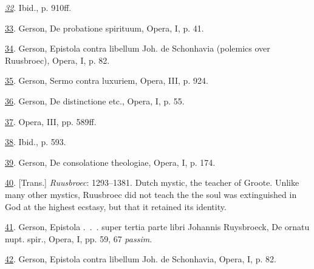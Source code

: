 \emph{\protect\hypertarget{23_NOTES.xhtmlux5cux23id_844}{\protect\hyperlink{15_Chapter_Eight__RELIGIOUS_EXCITAT.xhtmlux5cux23id_843}{32}}}.
Ibid., p. 910ff.

\protect\hypertarget{23_NOTES.xhtmlux5cux23id_842}{\protect\hyperlink{15_Chapter_Eight__RELIGIOUS_EXCITAT.xhtmlux5cux23id_841}{33}}.
Gerson, De probatione spirituum, Opera, I, p. 41.

\protect\hypertarget{23_NOTES.xhtmlux5cux23id_840}{\protect\hyperlink{15_Chapter_Eight__RELIGIOUS_EXCITAT.xhtmlux5cux23id_839}{34}}.
Gerson, Epistola contra libellum Joh. de Schonhavia (polemics over
Ruusbroec), Opera, I, p. 82.

\protect\hypertarget{23_NOTES.xhtmlux5cux23id_838}{\protect\hyperlink{15_Chapter_Eight__RELIGIOUS_EXCITAT.xhtmlux5cux23id_837}{35}}.
Gerson, Sermo contra luxuriem, Opera, III, p. 924.

\protect\hypertarget{23_NOTES.xhtmlux5cux23id_836}{\protect\hyperlink{15_Chapter_Eight__RELIGIOUS_EXCITAT.xhtmlux5cux23id_835}{36}}.
Gerson, De distinctione etc., Opera, I, p. 55.

\protect\hypertarget{23_NOTES.xhtmlux5cux23id_834}{\protect\hyperlink{15_Chapter_Eight__RELIGIOUS_EXCITAT.xhtmlux5cux23id_833}{37}}.
Opera, III, pp. 589ff.

\protect\hypertarget{23_NOTES.xhtmlux5cux23id_832}{\protect\hyperlink{15_Chapter_Eight__RELIGIOUS_EXCITAT.xhtmlux5cux23id_831}{38}}.
Ibid., p. 593.

\protect\hypertarget{23_NOTES.xhtmlux5cux23id_830}{\protect\hyperlink{15_Chapter_Eight__RELIGIOUS_EXCITAT.xhtmlux5cux23id_829}{39}}.
Gerson, De consolatione theologiae, Opera, I, p. 174.

\protect\hypertarget{23_NOTES.xhtmlux5cux23id_828}{\protect\hyperlink{15_Chapter_Eight__RELIGIOUS_EXCITAT.xhtmlux5cux23id_827}{40}}.
{[}Trans.{]} \emph{Ruusbroec}: 1293--1381. Dutch mystic, the teacher of
Groote. Unlike many other mystics, Ruusbroec did not teach the the soul
was extinguished in God at the highest ecstasy, but that it retained its
identity.

\protect\hypertarget{23_NOTES.xhtmlux5cux23id_826}{\protect\hyperlink{15_Chapter_Eight__RELIGIOUS_EXCITAT.xhtmlux5cux23id_825}{41}}.
Gerson, Epistola .~.~. super tertia parte libri Johannis Ruysbroeck, De
ornatu nupt. spir., Opera, I, pp. 59, 67 \emph{passim}.

\protect\hypertarget{23_NOTES.xhtmlux5cux23page_424}{\protect\hyperlink{15_Chapter_Eight__RELIGIOUS_EXCITAT.xhtmlux5cux23id_824}{42}}.
Gerson, Epistola contra libellum Joh. de Schonhavia, Opera, I, p. 82.

